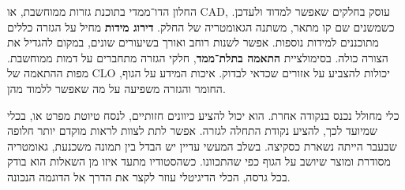 

\vspace{6mm}

{\fontsize{15}{23.2}\selectfont

החלון הדו־ממדי בתוכנת גזרות ממוחשבת, או \textenglish{CAD}, עוסק בחלקים שאפשר למדוד ולעדכן. כשמשנים שם קו מתאר, משתנה הגאומטריה של החלק. \textbf{דירוג מידות} מחיל על הגזרה כללים מתוכננים למידות נוספות. אפשר לשנות רוחב ואורך בשיעורים שונים, במקום להגדיל את הצורה כולה. בסימולציית \textbf{התאמה בתלת־ממד}, חלקי הגזרה מתחברים על דמות ממוחשבת. מפות ההתאמה של \textenglish{CLO} יכולות להצביע על אזורים שכדאי לבדוק. איכות המידע על הגוף, החומר והגזרה משפיעה על מה שאפשר ללמוד מהן. 

כלי מחולל נכנס בנקודה אחרת. הוא יכול להציע כיוונים חזותיים, לנסח טיוטת מפרט או, בכלי שמיועד לכך, להציע נקודת התחלה לגזרה. אפשר לתת לצוות לראות מוקדם יותר חלופה שבעבר הייתה נשארת כסקיצה. בשלב המעשי עדיין יש הבדל בין תמונה משכנעת, גאומטריה מסודרת ומוצר שיושב על הגוף כפי שהתכוונו. כשהסטודיו מתעד איזו מן השאלות הוא בודק בכל גרסה, הכלי הדיגיטלי עוזר לקצר את הדרך אל הדוגמה הנכונה. 

\par}
